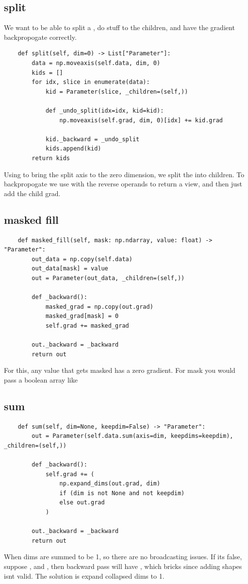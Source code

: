 \documentclass[11pt]{article}
\begin{document}
\subsection{split}
We want to be able to split a , do stuff to the children, and have the gradient backpropogate 
correctly. 
\begin{verbatim}
    def split(self, dim=0) -> List["Parameter"]:
        data = np.moveaxis(self.data, dim, 0)
        kids = []
        for idx, slice in enumerate(data):
            kid = Parameter(slice, _children=(self,))

            def _undo_split(idx=idx, kid=kid):
                np.moveaxis(self.grad, dim, 0)[idx] += kid.grad

            kid._backward = _undo_split
            kids.append(kid)
        return kids
\end{verbatim}
Using  to bring the split axis to the zero dimension, we split the  into children. 
To backpropogate we use  with the reverse operands to return a view, and then just add the child grad.
\subsection{masked fill}
\begin{verbatim}
    def masked_fill(self, mask: np.ndarray, value: float) -> "Parameter":
        out_data = np.copy(self.data)
        out_data[mask] = value
        out = Parameter(out_data, _children=(self,))

        def _backward():
            masked_grad = np.copy(out.grad)
            masked_grad[mask] = 0
            self.grad += masked_grad

        out._backward = _backward
        return out
\end{verbatim}
For this, any value that gets masked has a zero gradient. For mask you would pass a boolean array like 
\subsection{sum}
\begin{verbatim}
    def sum(self, dim=None, keepdim=False) -> "Parameter":
        out = Parameter(self.data.sum(axis=dim, keepdims=keepdim), _children=(self,))

        def _backward():
            self.grad += (
                np.expand_dims(out.grad, dim)
                if (dim is not None and not keepdim)
                else out.grad
            )

        out._backward = _backward
        return out
\end{verbatim}
When  dims are summed to be 1, so there are no broadcasting issues. If its false,
suppose , and , then backward pass will have
, which bricks since adding shapes
\pyth{[2, 3, 4] += [3]} isnt valid. The solution is expand collapsed dims to 1.
\end{document}
